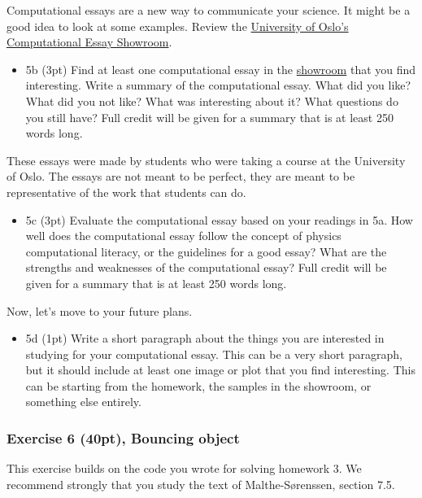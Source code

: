 \documentclass[11pt]{article}
\providecommand{\tightlist}{%
      \setlength{\itemsep}{0pt}\setlength{\parskip}{0pt}}
\begin{document}
Computational essays are a new way to communicate your science. It might
be a good idea to look at some examples. Review the
\href{https://uio-ccse.github.io/computational-essay-showroom}{University
of Oslo's Computational Essay Showroom}.

\begin{itemize}
\tightlist
\item
  5b (3pt) Find at least one computational essay in the
  \href{https://uio-ccse.github.io/computational-essay-showroom}{showroom}
  that you find interesting. Write a summary of the computational essay.
  What did you like? What did you not like? What was interesting about
  it? What questions do you still have? Full credit will be given for a
  summary that is at least 250 words long.
\end{itemize}

These essays were made by students who were taking a course at the
University of Oslo. The essays are not meant to be perfect, they are
meant to be representative of the work that students can do.

\begin{itemize}
\tightlist
\item
  5c (3pt) Evaluate the computational essay based on your readings in
  5a. How well does the computational essay follow the concept of
  physics computational literacy, or the guidelines for a good essay?
  What are the strengths and weaknesses of the computational essay? Full
  credit will be given for a summary that is at least 250 words long.
\end{itemize}

Now, let's move to your future plans.

\begin{itemize}
\tightlist
\item
  5d (1pt) Write a short paragraph about the things you are interested
  in studying for your computational essay. This can be a very short
  paragraph, but it should include at least one image or plot that you
  find interesting. This can be starting from the homework, the samples
  in the showroom, or something else entirely.
\end{itemize}

    \subsubsection{Exercise 6 (40pt), Bouncing
object}\label{exercise-6-40pt-bouncing-object}

This exercise builds on the code you wrote for solving homework 3. We
recommend strongly that you study the text of Malthe-Sørenssen, section
7.5.
\end{document}

